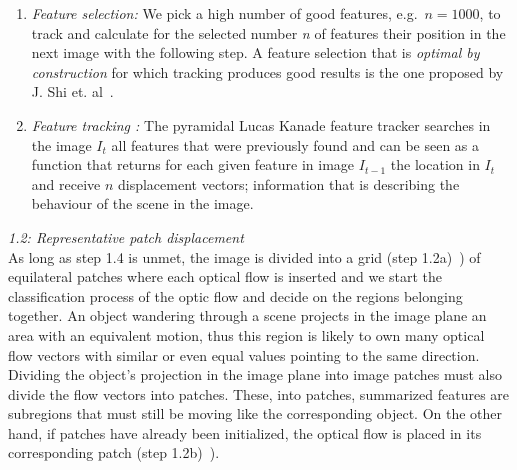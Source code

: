 \begin{enumerate}
	\item \textit{Feature selection: } We pick a high number of good features, e.g.\ $n=1000$, to track and calculate for the selected number \textit{n} of features their position in the next image with the following step. A feature selection that is \textit{optimal by construction} for which tracking produces good results %
	is the one proposed by J. Shi et. al\ \cite{GFT94-06}. %
	\item \textit{Feature tracking :} The pyramidal Lucas Kanade feature tracker searches in the image $I_t$ all features that were previously found \cite{PILKFT99} %
	and can be seen as a function that returns for each given feature in image $I_{t-1}$ the location in $I_{t}$ and receive $n$ displacement vectors; information that is describing the behaviour of the scene in the image.%
\end{enumerate}
%
\textit{1.2: Representative patch displacement} \\ \newline
As long as step 1.4 is unmet, the image is divided into a grid (step 1.2a)\ ) of equilateral patches where each optical flow is inserted and we start the classification process of the optic flow and decide on the regions belonging together. An object wandering through a scene projects in the image plane an area with an equivalent motion, thus this region is likely to own many optical flow vectors with similar or even equal values pointing to the same direction. Dividing the object's projection in the image plane into image patches must also divide the flow vectors into patches. These, into patches, summarized features are subregions that must still be moving like the corresponding object. \newline
On the other hand, if patches have already been initialized, the optical flow is placed in its corresponding patch (step 1.2b)\ ). \newline
%
